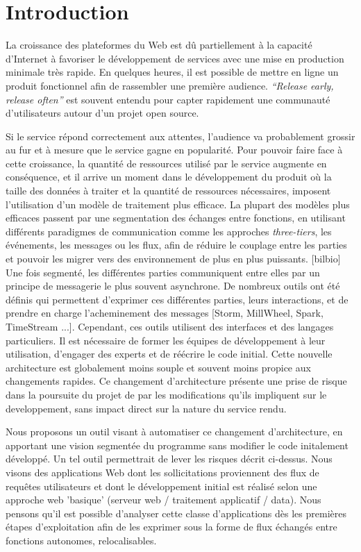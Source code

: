 \section{Introduction}

La croissance des plateformes du Web est dû partiellement à la capacité d'Internet à favoriser le développement de services avec une mise en production minimale très rapide.
En quelques heures, il est possible de mettre en ligne un produit fonctionnel afin de rassembler une première audience.
\textit{``Release early, release often''} est souvent entendu pour capter rapidement une communauté d'utilisateurs autour d'un projet open source.

Si le service répond correctement aux attentes, l'audience va probablement grossir au fur et à mesure que le service gagne en popularité.
Pour pouvoir faire face à cette croissance, la quantité de ressources utilisé par le service augmente en conséquence, et il arrive un moment dans le développement du produit où la taille des données à traiter et la quantité de ressources nécessaires, imposent l'utilisation d'un modèle de traitement plus efficace.
La plupart des modèles plus efficaces passent par une segmentation des échanges entre fonctions, en utilisant différents paradigmes de communication comme les approches \textit{three-tiers}, les événements, les messages ou les flux, afin de réduire le couplage entre les parties et pouvoir les migrer vers des environnement de plus en plus puissants. [bilbio]
Une fois segmenté, les différentes parties communiquent entre elles par un principe de messagerie le plus souvent asynchrone.
De nombreux outils ont été définis qui permettent d'exprimer ces différentes parties, leurs interactions, et de prendre en charge l'acheminement des messages [Storm, MillWheel, Spark, TimeStream ...].
Cependant, ces outils utilisent des interfaces et des langages particuliers.
Il est nécessaire de former les équipes de développement à leur utilisation, d'engager des experts et de réécrire le code initial.
Cette nouvelle architecture est globalement moins souple et souvent moins propice aux changements rapides.
Ce changement d'architecture présente une prise de risque dans la poursuite du projet de par les modifications qu'ils impliquent sur le developpement, sans impact direct sur la nature du service rendu.

Nous proposons un outil visant à automatiser ce changement d'architecture, en apportant une vision segmentée du programme sans modifier le code initalement développé.
Un tel outil permettrait de lever les risques décrit ci-dessus.
Nous visons des applications Web dont les sollicitations proviennent des flux de requêtes utilisateurs et dont le développement initial est réalisé selon une approche web 'basique' (serveur web / traitement applicatif / data).
Nous pensons qu'il est possible d'analyser cette classe d'applications dès les premières étapes d'exploitation afin de les exprimer sous la forme de flux échangés entre fonctions autonomes, relocalisables.

